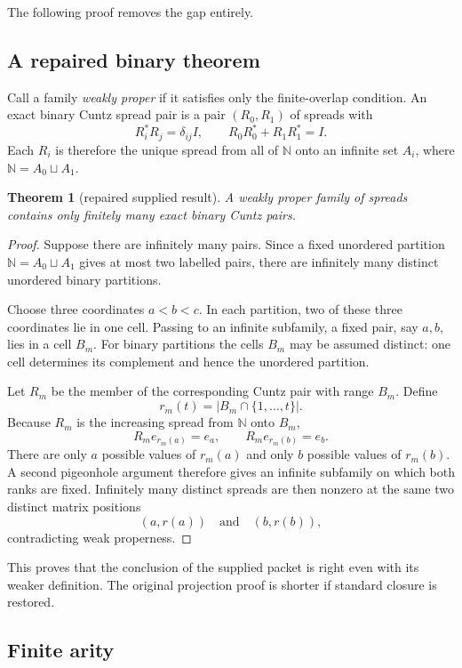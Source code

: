 \documentclass[11pt]{article}
\newtheorem{theorem}{Theorem}[section]
\theoremstyle{definition}
\theoremstyle{remark}
\newcommand{\N}{\mathbb N}
\begin{document}
The following proof removes the gap entirely.

\subsection{A repaired binary theorem}

Call a family \emph{weakly proper} if it satisfies only the finite-overlap
condition.  An exact binary Cuntz spread pair is a pair $(R_0,R_1)$ of spreads
with
\[
 R_i^*R_j=\delta_{ij}I,
 \qquad R_0R_0^*+R_1R_1^*=I.
\]
Each $R_i$ is therefore the unique spread from all of $\N$ onto an infinite set
$A_i$, where $\N=A_0\sqcup A_1$.

\begin{theorem}[repaired supplied result]\label{thm:binary-repair}
A weakly proper family of spreads contains only finitely many exact binary
Cuntz pairs.
\end{theorem}

\begin{proof}
Suppose there are infinitely many pairs.  Since a fixed unordered partition
$\N=A_0\sqcup A_1$ gives at most two labelled pairs, there are infinitely many
distinct unordered binary partitions.

Choose three coordinates $a<b<c$.  In each partition, two of these three
coordinates lie in one cell.  Passing to an infinite subfamily, a fixed pair,
say $a,b$, lies in a cell $B_m$.  For binary partitions the cells $B_m$ may be
assumed distinct: one cell determines its complement and hence the unordered
partition.

Let $R_m$ be the member of the corresponding Cuntz pair with range $B_m$.
Define
\[
 r_m(t)=|B_m\cap\{1,\dots,t\}|.
\]
Because $R_m$ is the increasing spread from $\N$ onto $B_m$,
\[
 R_m e_{r_m(a)}=e_a,
 \qquad
 R_m e_{r_m(b)}=e_b.
\]
There are only $a$ possible values of $r_m(a)$ and only $b$ possible values of
$r_m(b)$.  A second pigeonhole argument therefore gives an infinite subfamily
on which both ranks are fixed.  Infinitely many distinct spreads are then
nonzero at the same two distinct matrix positions
\[
 (a,r(a))\quad\text{and}\quad(b,r(b)),
\]
contradicting weak properness.
\end{proof}

This proves that the conclusion of the supplied packet is right even with its
weaker definition.  The original projection proof is shorter if standard
closure is restored.

\subsection{Finite arity}
\end{document}

